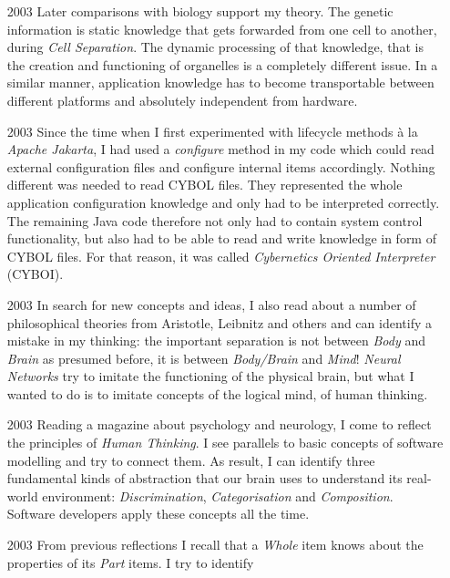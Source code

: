 \begin{itemize}
    \item[2003] Later comparisons with biology support my theory. The genetic
        information is static knowledge that gets forwarded from one cell to
        another, during \emph{Cell Separation}. The dynamic processing of that
        knowledge, that is the creation and functioning of organelles is a
        completely different issue. In a similar manner, application knowledge
        has to become transportable between different platforms and absolutely
        independent from hardware.
    \item[2003] Since the time when I first experimented with lifecycle methods
        \`a la \emph{Apache Jakarta}, I had used a \emph{configure} method in
        my code which could read external configuration files and configure
        internal items accordingly. Nothing different was needed to read CYBOL
        files. They represented the whole application configuration knowledge
        and only had to be interpreted correctly. The remaining Java code
        therefore not only had to contain system control functionality, but
        also had to be able to read and write knowledge in form of CYBOL files.
        For that reason, it was called \emph{Cybernetics Oriented Interpreter}
        (CYBOI).
    \item[2003] In search for new concepts and ideas, I also read about a
        number of philosophical theories from Aristotle, Leibnitz and others
        and can identify a mistake in my thinking: the important separation is
        not between \emph{Body} and \emph{Brain} as presumed before, it is
        between \emph{Body/Brain} and \emph{Mind}! \emph{Neural Networks} try
        to imitate the functioning of the physical brain, but what I wanted to
        do is to imitate concepts of the logical mind, of human thinking.
    \item[2003] Reading a magazine about psychology and neurology, I come to
        reflect the principles of \emph{Human Thinking}. I see parallels to
        basic concepts of software modelling and try to connect them. As result,
        I can identify three fundamental kinds of abstraction that our brain
        uses to understand its real-world environment: \emph{Discrimination},
        \emph{Categorisation} and \emph{Composition}. Software developers apply
        these concepts all the time.
    \item[2003] From previous reflections I recall that a \emph{Whole} item
        knows about the properties of its \emph{Part} items. I try to identify

\end{itemize}
